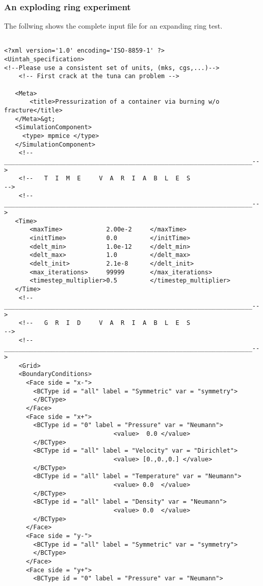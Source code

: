   \subsubsection{An exploding ring experiment}
  The follwing shows the complete input file for an expanding ring test.
  \begin{verbatim}

<?xml version='1.0' encoding='ISO-8859-1' ?>
<Uintah_specification> 
<!--Please use a consistent set of units, (mks, cgs,...)-->
    <!-- First crack at the tuna can problem -->

   <Meta>
       <title>Pressurization of a container via burning w/o fracture</title>
   </Meta>&gt;    
   <SimulationComponent>
     <type> mpmice </type>
   </SimulationComponent>
    <!--____________________________________________________________________-->
    <!--   T  I  M  E     V  A  R  I  A  B  L  E  S                         -->
    <!--____________________________________________________________________-->
   <Time>
       <maxTime>            2.00e-2     </maxTime>
       <initTime>           0.0         </initTime>
       <delt_min>           1.0e-12     </delt_min>
       <delt_max>           1.0         </delt_max>
       <delt_init>          2.1e-8      </delt_init>
       <max_iterations>     99999       </max_iterations>
       <timestep_multiplier>0.5         </timestep_multiplier>
   </Time>    
    <!--____________________________________________________________________-->
    <!--   G  R  I  D     V  A  R  I  A  B  L  E  S                         -->
    <!--____________________________________________________________________-->
    <Grid>
    <BoundaryConditions>
      <Face side = "x-">
        <BCType id = "all" label = "Symmetric" var = "symmetry">
        </BCType>
      </Face>
      <Face side = "x+">
        <BCType id = "0" label = "Pressure" var = "Neumann">
                              <value>  0.0 </value>
        </BCType>
        <BCType id = "all" label = "Velocity" var = "Dirichlet">
                              <value> [0.,0.,0.] </value>
        </BCType>
        <BCType id = "all" label = "Temperature" var = "Neumann">
                              <value> 0.0  </value>
        </BCType>
        <BCType id = "all" label = "Density" var = "Neumann">
                              <value> 0.0  </value>
        </BCType>
      </Face>
      <Face side = "y-">
        <BCType id = "all" label = "Symmetric" var = "symmetry">
        </BCType>
      </Face>                  
      <Face side = "y+">
        <BCType id = "0" label = "Pressure" var = "Neumann">

\end{verbatim}

